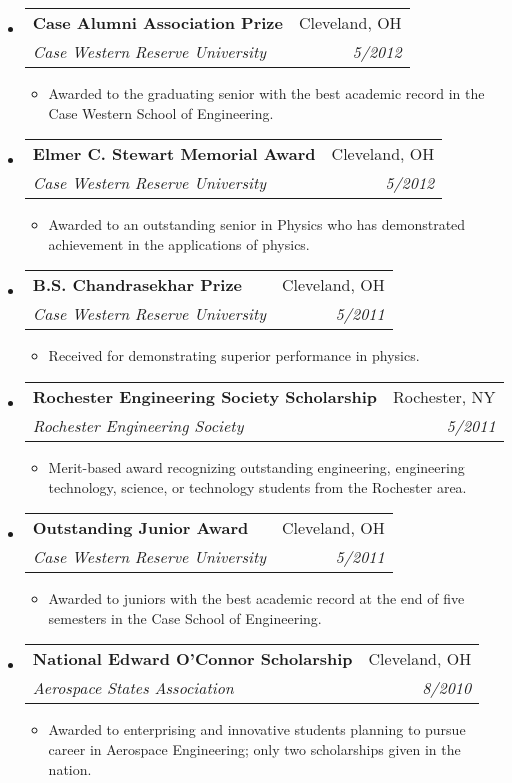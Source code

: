 \documentclass[letterpaper,11pt]{article}
\makeatletter
\newcommand{\resitem}[1]{\item #1 \vspace{-2pt}}
\newcommand{\ressubheading}[4]{\vspace{-14pt}
\begin{tabular*}{7.0in}{l@{\extracolsep{\fill}}r}
                \\
                \textbf{#1} & #2 \\
                \textit{#3} & \textit{#4} \\
\end{tabular*}\vspace{-6pt}}
\makeatother
\begin{document}
\begin{itemize}

\item
        \ressubheading{Case Alumni Association Prize}{Cleveland, OH}{Case Western Reserve University}{5/2012}
        \begin{itemize}
                \resitem{
        Awarded to the graduating senior with the best academic record in the Case Western School of Engineering.
                }
        \end{itemize}

\item
        \ressubheading{Elmer C. Stewart Memorial Award}{Cleveland, OH}{Case Western Reserve University}{5/2012}
        \begin{itemize}
                \resitem{
        Awarded to an outstanding senior in Physics who has demonstrated achievement in the applications of physics.
                }
        \end{itemize}

\item
        \ressubheading{B.S. Chandrasekhar Prize}{Cleveland, OH}{Case Western Reserve University}{5/2011}
        \begin{itemize}
                \resitem{
        Received for demonstrating superior performance in physics.
                }
        \end{itemize}


\item
        \ressubheading{Rochester Engineering Society Scholarship}{Rochester, NY}{Rochester Engineering Society}{5/2011}
        \begin{itemize}
                \resitem{
        Merit-based award recognizing outstanding engineering, engineering technology, science, or technology students from the Rochester area.
                }
        \end{itemize}

\item
        \ressubheading{Outstanding Junior Award}{Cleveland, OH}{Case Western Reserve University}{5/2011}
        \begin{itemize}
                \resitem{
        Awarded to juniors with the best academic record at the end of five semesters in the Case School of Engineering.
                }
        \end{itemize}
        
\item
        \ressubheading{National Edward O'Connor Scholarship}{Cleveland, OH}{Aerospace States Association}{8/2010}
        \begin{itemize}
                \resitem{
        Awarded to enterprising and innovative students planning to pursue career in Aerospace Engineering; only two scholarships given in the nation.
                }
        \end{itemize}           


\end{itemize}
\end{document}
